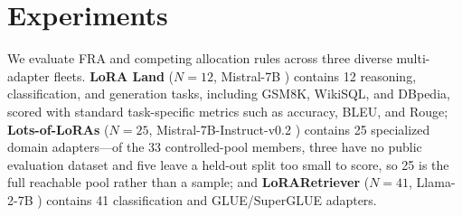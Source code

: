\documentclass{article}
\begin{document}
\section{Experiments}
\label{sec:experiments}

We evaluate FRA and competing allocation rules across three diverse
multi-adapter fleets. \textbf{LoRA Land} ($N=12$, Mistral-7B
\citep{predibase2024loraland}) contains 12 reasoning, classification, and
generation tasks, including GSM8K, WikiSQL, and DBpedia, scored with standard
task-specific metrics such as accuracy, BLEU, and Rouge; \textbf{Lots-of-LoRAs}
($N=25$, Mistral-7B-Instruct-v0.2 \citep{lotsofloras2024collection}) contains
25 specialized domain adapters---of the 33 controlled-pool members, three have
no public evaluation dataset and five leave a held-out split too small to score,
so 25 is the full reachable pool rather than a sample; and
\textbf{LoRARetriever} ($N=41$, Llama-2-7B
\citep{zhao2024loraretriever}) contains 41 classification and GLUE/SuperGLUE
adapters.
\end{document}
